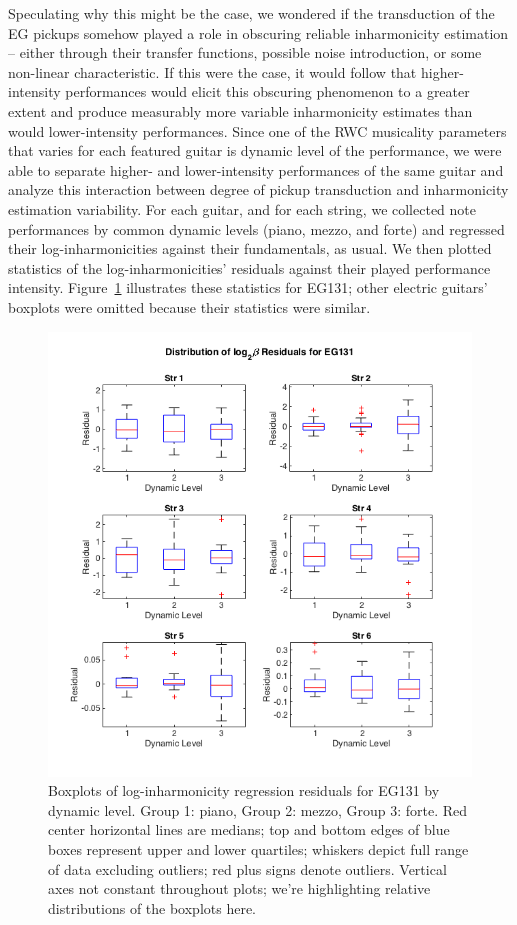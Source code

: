 \documentclass[12pt]{cmuthesis}
\begin{document}
Speculating why this might be the case, we wondered if the transduction of the EG pickups somehow played a role in obscuring reliable inharmonicity estimation -- either through their transfer functions, possible noise introduction, or some non-linear characteristic. If this were the case, it would follow that higher-intensity performances would elicit this obscuring phenomenon to a greater extent and produce measurably more variable inharmonicity estimates than would lower-intensity performances. Since one of the RWC musicality parameters that varies for each featured guitar is dynamic level of the performance, we were able to separate higher- and lower-intensity performances of the same guitar and analyze this interaction between degree of pickup transduction and inharmonicity estimation variability. For each guitar, and for each string, we collected note performances by common dynamic levels (piano, mezzo, and forte) and regressed their log-inharmonicities against their fundamentals, as usual. We then plotted statistics of the log-inharmonicities' residuals against their played performance intensity. Figure~\ref{fig:eg1-string-dyn} illustrates these statistics for EG131; other electric guitars' boxplots were omitted because their statistics were similar.
\begin{figure}[!htbp] 
\label{fig:eg1-string-dyn}
\centering
\includegraphics[scale=0.75]{eg1-string-dyn}
\caption{Boxplots of log-inharmonicity regression residuals for EG131 by dynamic level. Group 1: piano, Group 2: mezzo, Group 3: forte. Red center horizontal lines are medians; top and bottom edges of blue boxes represent upper and lower quartiles; whiskers depict full range of data excluding outliers; red plus signs denote outliers. Vertical axes not constant throughout plots; we're highlighting relative distributions of the boxplots here.}
\end{figure} 
\end{document}
